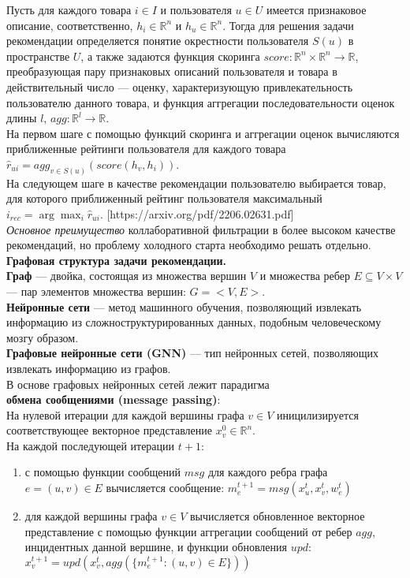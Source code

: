 \documentclass{mipt-thesis-ms}
\begin{document}
Пусть для каждого товара $i \in I$ и пользователя $u \in U$ имеется признаковое описание, соответственно, $h_i \in \mathbb{R}^n$ и $h_u \in \mathbb{R}^n$. Тогда для решения задачи рекомендации определяется понятие окрестности пользователя $S(u)$ в пространстве $U$, а также задаются функция скоринга $score: \mathbb{R}^n \times \mathbb{R}^n \rightarrow \mathbb{R}$, преобразующая пару признаковых описаний пользователя и товара в действительный число --- оценку, характеризующую привлекательность пользователю данного товара, и функция аггрегации последовательности оценок длины $l$, $agg: \mathbb{R}^l \rightarrow \mathbb{R}$. \\
На первом шаге с помощью функций скоринга и аггрегации оценок вычисляются приближенные рейтинги пользователя для каждого товара $\hat r_{ui} = {agg}_{v \in S(u)}(score(h_v, h_i))$. \\
На следующем шаге в качестве рекомендации пользователю выбирается товар, для которого приближенный рейтинг пользователя максимальный $i_{rec} = \arg \max_i \hat r_{ui}$. [https://arxiv.org/pdf/2206.02631.pdf]
\\

{\it Основное преимущество} коллаборативной фильтрации в более высоком качестве рекомендаций, но проблему холодного старта необходимо решать отдельно.
\\

{\bf Графовая структура задачи рекомендации.}\\
{\bf Граф} --- двойка, состоящая из множества вершин $V$ и множества ребер $E \subseteq V \times V$ --- пар элементов множества вершин: \:$G = <V, E>$.\\
{\bf Нейронные сети} --- метод машинного обучения, позволяющий извлекать информацию из сложноструктурированных данных, подобным человеческому мозгу образом.\\
{\bf Графовые нейронные сети (GNN)} --- тип нейронных сетей, позволяющих извлекать информацию из графов. \\

В основе графовых нейронных сетей лежит парадигма\\{\bf обмена сообщениями (message passing)}:
\\На нулевой итерации для каждой вершины графа $v \in V$ иницилизируется соответствующее векторное представление $x_v^0 \in \mathbb{R}^n$.
\\На каждой последующей итерации $t+1$:
\begin{enumerate}
    \item с помощью функции сообщений $msg$ для каждого ребра графа $e = (u, v) \in E$ вычисляется сообщение: $m_e^{t+1} = msg(x_u^t, x_v^t, w_e^t)$
    \item для каждой вершины графа $v \in V$ вычисляется обновленное векторное представление с помощью функции аггрегации сообщений от ребер $agg$, инцидентных данной вершине, и функции обновления $upd$: $x_v^{t+1} = upd(x_v^t, agg(\{m_e^{t+1}: (u, v) \in E\}))$
\end{enumerate}
\end{document}
